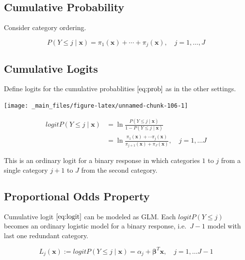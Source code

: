 \documentclass[]{book}
\begin{document}
\hypertarget{cumulative-probability}{%
\subsection{Cumulative Probability}\label{cumulative-probability}}

Consider category ordering.

\begin{equation}
P(Y \le j \mid \mathbf{x}) = \pi_1(\mathbf{x}) + \cdots + \pi_j(\mathbf{x}), \quad j = 1,\ldots, J
\label{eq:prob}
\end{equation}

\hypertarget{cumulative-logits-1}{%
\subsection{Cumulative Logits}\label{cumulative-logits-1}}

Define logits for the cumulative probablities \(\eqref{eq:prob}\) as in the other settings.

\begin{center}\texttt{[image: \_main\_files/figure-latex/unnamed-chunk-106-1]} \end{center}

\begin{equation}
\begin{split}
logit P(Y \le j \mid \mathbf{x}) & = \ln\frac{P(Y \le j \mid \mathbf{x})}{1 - P(Y \le j \mid \mathbf{x})} \\
& = \ln\frac{\pi_1(\mathbf{x}) + \cdots \pi_j (\mathbf{x})}{\pi_{j + 1}(\mathbf{x}) + \pi_J(\mathbf{x})}, \quad j = 1, \ldots J
\end{split}
\label{eq:logit}
\end{equation}

This is an ordinary logit for a binary response in which categories \(1\) to \(j\) from a single category \(j + 1\) to \(J\) from the second category.

\hypertarget{proportional-odds-property}{%
\subsection{Proportional Odds Property}\label{proportional-odds-property}}

Cumulative logit \(\eqref{eq:logit}\) can be modeled as GLM. Each \(logit P(Y \le j)\) becomes an ordinary logistic model for a binary response, i.e.~\(J - 1\) model with last one redundant category.

\begin{equation}
L_j(\mathbf{x}) := logit P(Y \le j \mid \mathbf{x}) = \alpha_j + \boldsymbol\beta^T\mathbf{x}, \quad j = 1, \ldots J - 1
\label{eq:model}
\end{equation}
\end{document}
